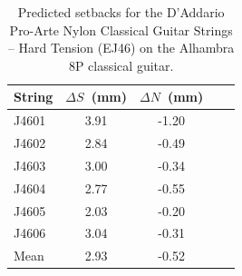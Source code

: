  \begin{table}[htbp]
  \centering
  \caption{\label{tbl:ej46_setbacks} Predicted setbacks for the D'Addario Pro-Arte Nylon Classical Guitar Strings -- Hard Tension (EJ46) on the Alhambra 8P classical guitar.}
    \begin{tabular}{lcccc}
    \hline \hline
    String  & $\Delta S$~(mm) & $\Delta N$~(mm) \\
    \hline
    J4601 & 3.91 & -1.20 \\
    J4602 & 2.84 & -0.49 \\
    J4603 & 3.00 & -0.34 \\
    J4604 & 2.77 & -0.55 \\
    J4605 & 2.03 & -0.20 \\
    J4606 & 3.04 & -0.31 \\
    \hline \hline
    Mean & 2.93 & -0.52 \\
    \hline
    \end{tabular}%
 \end{table}%

